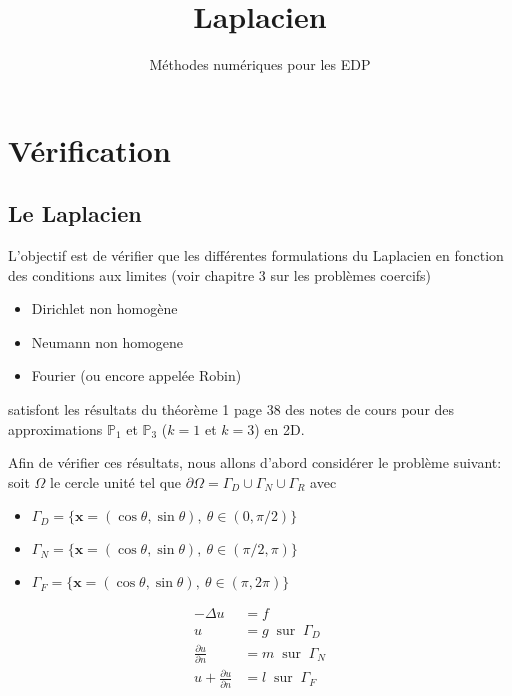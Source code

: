 \documentclass[11pt,utf8]{article}
\title{Laplacien}
\author{Méthodes numériques pour les EDP}
\date{}
\begin{document}
\maketitle

\section{Vérification}
\label{sec:verification-1}


\subsection{Le Laplacien}
\label{sec:le-laplacian}


L'objectif est de vérifier que les différentes formulations du Laplacien en
fonction des conditions aux limites (voir chapitre 3 sur les problèmes
coercifs)
\begin{itemize}
\item Dirichlet non homogène
\item Neumann non homogene
\item Fourier (ou encore appelée Robin)
\end{itemize}
satisfont les résultats du théorème 1 page 38 des notes de cours pour des approximations $\mathbb{P}_1$ et
$\mathbb{P}_3$ ($k=1$ et $k=3$) en 2D.

Afin de vérifier ces résultats, nous allons d'abord considérer le problème suivant:
soit $\Omega$ le cercle unité tel que $\partial \Omega = \Gamma_D \cup
\Gamma_N \cup \Gamma_R$ avec
\begin{itemize}
\item $\Gamma_D = \{\mathbf{x} = (\cos\theta,\sin\theta),\ \theta \in (0,\pi/2) \}$
\item $\Gamma_N = \{\mathbf{x} = (\cos\theta,\sin\theta),\ \theta \in (\pi/2,\pi) \}$
\item $\Gamma_F = \{\mathbf{x} = (\cos\theta,\sin\theta),\ \theta \in (\pi,2\pi) \}$
\end{itemize}

\begin{equation}
  \label{eq:3}
  \begin{split}
    -\Delta u &= f\\
    u &= g\ \mbox{ sur }\ \Gamma_D\\
    \frac{\partial u}{\partial n} &= m\ \mbox{ sur }\ \Gamma_N\\
    u + \frac{\partial u}{\partial n} &= l\ \mbox{ sur }\ \Gamma_F\\
  \end{split}
\end{equation}
\end{document}
